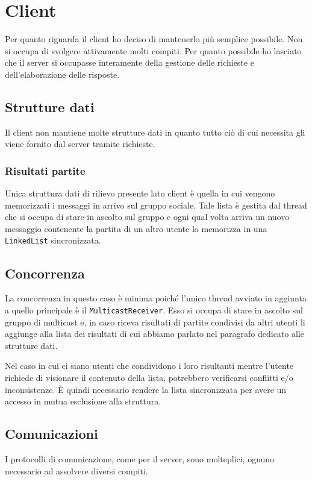 \section{Client}
Per quanto riguarda il client ho deciso di mantenerlo più semplice possibile. Non si occupa di
svolgere attivamente molti compiti. Per quanto possibile ho lasciato che il server si occupasse
interamente della gestione delle richieste e dell'elaborazione delle risposte.

\subsection{Strutture dati}
Il client non mantiene molte strutture dati in quanto tutto ciò di cui necessita gli viene fornito
dal server tramite richieste.

\subsubsection{Risultati partite}
Unica struttura dati di rilievo presente lato client è quella in cui vengono memorizzati i
messaggi in arrivo sul gruppo sociale. Tale lista è gestita dal thread che si occupa di stare in
ascolto sul gruppo e ogni qual volta arriva un nuovo messaggio contenente la partita di un altro
utente lo memorizza in una \verb|LinkedList| sincronizzata.

\subsection{Concorrenza}
La concorrenza in questo caso è minima poiché l'unico thread avviato in aggiunta a quello
principale è il \verb|MulticastReceiver|. Esso si occupa di stare in ascolto sul gruppo di
multicast e, in caso riceva risultati di partite condivisi da altri utenti li aggiunge alla lista
dei risultati di cui abbiamo parlato nel paragrafo dedicato alle strutture dati.

Nel caso in cui ci siano utenti che condividono i loro risultanti mentre l'utente richiede di
visionare il contenuto della lista, potrebbero verificarsi conflitti e/o inconsistenze. \`E quindi
necessario rendere la lista sincronizzata per avere un accesso in mutua esclusione alla struttura.

\subsection{Comunicazioni}
I protocolli di comunicazione, come per il server, sono molteplici, ognuno necessario ad assolvere
diversi compiti.

